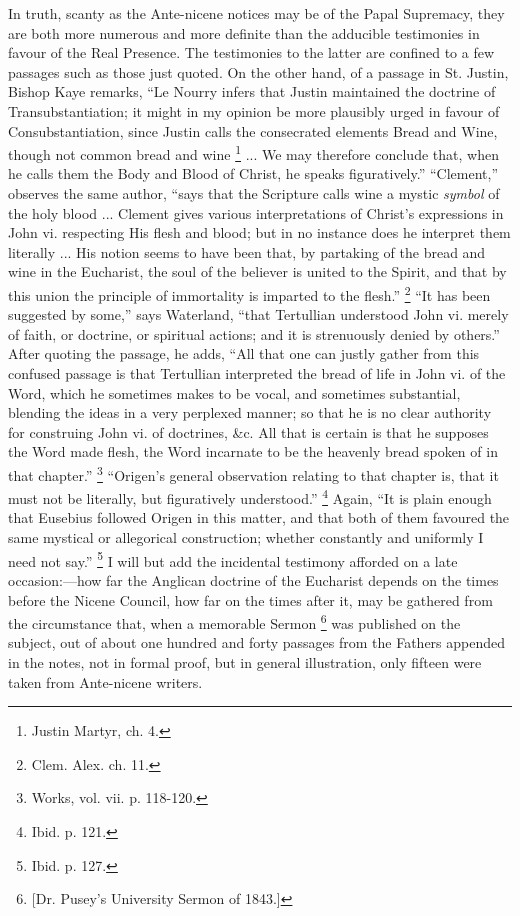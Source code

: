 In truth, scanty as the Ante-nicene notices may be of
the Papal Supremacy, they are both more numerous and more
definite than the adducible testimonies in favour of the
Real Presence. The testimonies to the latter are confined
to a few passages such as those just quoted. On the other
hand, of a passage in St. Justin, Bishop Kaye remarks,
``Le Nourry infers that Justin maintained the
doctrine of Transubstantiation; it might in my opinion be
more plausibly urged in favour of Consubstantiation,
since Justin calls the consecrated elements Bread and
Wine, though not common bread and wine \footnote{Justin Martyr, ch. 4.} ...
We may therefore conclude that, when he calls them the
Body and Blood of Christ, he speaks figuratively.''
``Clement,'' observes the same author, ``says
that the Scripture calls wine a mystic \emph{symbol} of
the holy blood ... Clement gives various interpretations
of Christ's expressions in John vi. respecting His flesh
and blood; but in no instance does he interpret them
literally ... His notion seems to have been that, by
partaking of the bread and wine in the Eucharist, the
soul of the believer is united to the Spirit, and that by
this union the principle of immortality is imparted to
the flesh.'' \footnote{Clem. Alex. ch. 11.} ``It has been suggested
by some,'' says Waterland, ``that Tertullian
understood John vi. merely of faith, or doctrine, or
spiritual actions; and it is strenuously denied by others.'' After quoting the passage, he adds, ``All that one can justly gather from
this confused passage is that Tertullian interpreted the
bread of life in John vi. of the Word, which he sometimes
makes to be vocal, and sometimes substantial, blending
the ideas in a very perplexed manner; so that he is no
clear authority for construing John vi. of doctrines,
\&c. All that is certain is that he supposes the Word
made flesh, the Word incarnate to be the heavenly bread
spoken of in that chapter.'' \footnote{Works, vol. vii. p. 118-120.} ``Origen's general
observation relating to that chapter is, that it must not
be literally, but figuratively understood.'' \footnote{Ibid. p. 121.}
Again, ``It is plain enough that Eusebius followed
Origen in this matter, and that both of them favoured the
same mystical or allegorical construction; whether
constantly and uniformly I need not say.'' \footnote{Ibid. p. 127.} I
will but add the incidental testimony afforded on a late
occasion:—how far the Anglican doctrine of the
Eucharist depends on the times before the Nicene Council,
how far on the times after it, may be gathered from the
circumstance that, when a memorable Sermon \footnote{[Dr. Pusey's University Sermon
of 1843.]} was
published on the subject, out of about one hundred and
forty passages from the Fathers appended in the notes,
not in formal proof, but in general illustration, only
fifteen were taken from Ante-nicene writers.

